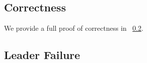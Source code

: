 
\subsection{Correctness}
We provide a full proof of correctness in ~\ref{}.

\subsection{Leader Failure}


